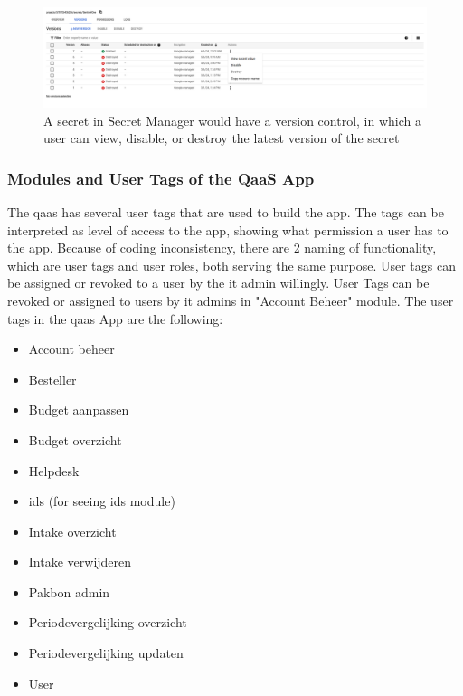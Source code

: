 \begin{figure}[H]
      \centering
      \includegraphics[width=1.0\textwidth]{Figures/Secret Manager Actions.png}
      \caption{A secret in Secret Manager would have a version control, in which a user can view, disable, or destroy the latest version
            of the secret}
\end{figure}

\subsubsection{Modules and User Tags  of the QaaS App} %

The \acrshort{qaas} has several user tags that are used to build the app. The tags can be interpreted as level of access to the app,
showing what permission a user has to the app. Because of coding inconsistency, there are 2 naming of functionality, which are user
tags and user roles, both serving the same purpose. User tags can be assigned or revoked to a user by the \acrshort{it} admin
willingly. User Tags can be revoked or assigned to users by \acrshort{it} admins in "Account Beheer" module. The user tags in
the \acrshort{qaas} App are the following:

\begin{itemize}
      \item Account beheer
      \item Besteller
      \item Budget aanpassen
      \item Budget overzicht
      \item Helpdesk
      \item \acrshort{ids} (for seeing \acrshort{ids} module)
      \item Intake overzicht
      \item Intake verwijderen
      \item Pakbon admin
      \item Periodevergelijking overzicht
      \item Periodevergelijking updaten
      \item User
\end{itemize}

